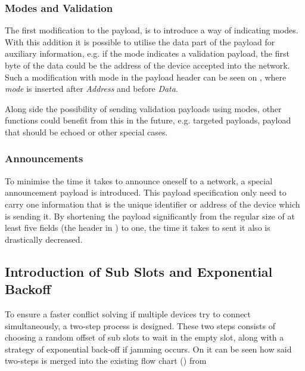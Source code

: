 \subsubsection{Modes and Validation} %
\label{ssub:modes_and_validation}
The first modification to the payload, is to introduce a way of indicating modes.
With this addition it is possible to utilise the data part of the payload for auxiliary information, e.g. if the mode indicates a validation payload, the first byte of the data could be the address of the device accepted into the network.
Such a modification with mode in the payload header can be seen on , where \emph{mode} is inserted after \emph{Address} and before \emph{Data}. 


\noindent
Along side the possibility of sending validation payloads using modes, other functions could benefit from this in the future, e.g. targeted payloads, payload that should be echoed or other special cases.

\subsubsection{Announcements} %
\label{ssub:announcements}
To minimise the time it takes to announce oneself to a network, a special announcement payload is introduced.
This payload specification only need to carry one information that is the unique identifier or address of the device which is sending it.
By shortening the payload significantly from the regular size of at least five fields (the header in ) to one, the time it takes to sent it also is drastically decreased.


\subsection{Introduction of Sub Slots and Exponential Backoff} %
\label{sub:introduction_of_sub_slots_and_exponential_backoff}
To ensure a faster conflict solving if multiple devices try to connect simultaneously, a two-step process is designed.
These two steps consists of choosing a random offset of sub slots to wait in the empty slot, along with a strategy of exponential back-off if jamming occurs.
On  it can be seen how said two-steps is merged into the existing flow chart () from 

